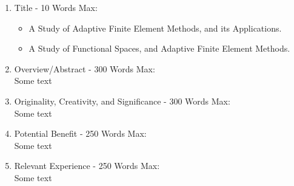 \documentclass[11pt]{article}
\begin{document}
\pagestyle{fancy}
\fancyhead{}
\fancyhead[L]{\textbf{\rightmark}}

\begin{enumerate}

\item Title - 10 Words Max:
\begin{itemize}
\item A Study of Adaptive Finite Element Methods, and its Applications.
\item A Study of Functional Spaces, and Adaptive Finite Element Methods.
\end{itemize}

\item Overview/Abstract - 300 Words Max: \\
Some text

\item Originality, Creativity, and Significance - 300 Words Max: \\
Some text

\item Potential Benefit - 250 Words Max: \\
Some text

\item Relevant Experience - 250 Words Max: \\
Some text

\end{enumerate}
\end{document}
